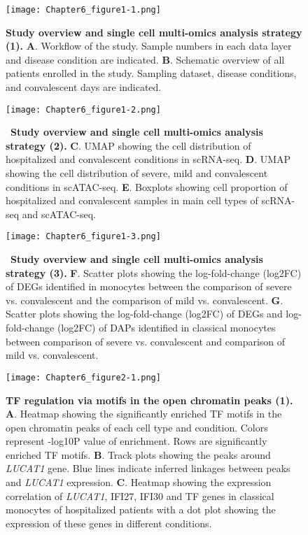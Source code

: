 \documentclass{book}
\begin{document}
\begin{refsection}
\begin{figure}%
  \centering
  \texttt{[image: Chapter6\_figure1-1.png]}
  \caption{\label{fig:chp6fig1}
    \textbf{Study overview and single cell multi-omics analysis strategy (1).}
    \textbf{A}. Workflow of the study. Sample numbers in each data layer and disease condition are indicated.
    \textbf{B}. Schematic overview of all patients enrolled in the study. Sampling dataset, disease conditions, and convalescent days are indicated.
  }
\end{figure}
\begin{figure}%
  \centering
  \texttt{[image: Chapter6\_figure1-2.png]}
  \addtocounter{figure}{-1}
  \caption{
    ~\textbf{Study overview and single cell multi-omics analysis strategy (2).}
    \textbf{C}. UMAP showing the cell distribution of hospitalized and convalescent conditions in scRNA-seq.
    \textbf{D}. UMAP showing the cell distribution of severe, mild and convalescent conditions in scATAC-seq.
    \textbf{E}. Boxplots showing cell proportion of hospitalized and convalescent samples in main cell types of scRNA-seq and scATAC-seq.
  }
\end{figure}
\begin{figure}%
  \centering
  \texttt{[image: Chapter6\_figure1-3.png]}
  \addtocounter{figure}{-1}
  \caption{
    ~\textbf{Study overview and single cell multi-omics analysis strategy (3).}
    \textbf{F}. Scatter plots showing the log-fold-change (log2FC) of DEGs identified in monocytes between the comparison of severe vs. convalescent and the comparison of mild vs. convalescent.
    \textbf{G}. Scatter plots showing the log-fold-change (log2FC) of DEGs and log-fold-change (log2FC) of DAPs identified in classical monocytes between comparison of severe vs. convalescent and comparison of mild vs. convalescent.
  }
\end{figure}

\begin{figure}%
  \centering
  \texttt{[image: Chapter6\_figure2-1.png]}
  \caption{\label{fig:chp6fig2}
    \textbf{TF regulation via motifs in the open chromatin peaks (1).}
    \textbf{A}. Heatmap showing the significantly enriched TF motifs in the open chromatin peaks of each cell type and condition. Colors represent -log10P value of enrichment. Rows are significantly enriched TF motifs.
    \textbf{B}. Track plots showing the peaks around \textit{LUCAT1} gene. Blue lines indicate inferred linkages between peaks and \textit{LUCAT1} expression.
    \textbf{C}. Heatmap showing the expression correlation of \textit{LUCAT1}, IFI27, IFI30 and TF genes in classical monocytes of hospitalized patients with a dot plot showing the expression of these genes in different conditions.
  }
\end{figure}


\end{refsection}
\end{document}
